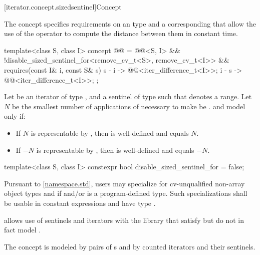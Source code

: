 [iterator.concept.sizedsentinel]{Concept }

\pnum
The  concept specifies
requirements on an  type  and
a corresponding 
that allow the use of the \tcode{-} operator to compute the distance
between them in constant time.

\begin{itemdecl}
template<class S, class I>
  concept @@ =
    @@<S, I> &&
    !disable_sized_sentinel_for<remove_cv_t<S>, remove_cv_t<I>> &&
    requires(const I& i, const S& s) {
      { s - i } -> @@<iter_difference_t<I>>;
      { i - s } -> @@<iter_difference_t<I>>;
    };
\end{itemdecl}

\begin{itemdescr}
\pnum
Let  be an iterator of type , and 
a sentinel of type  such that  denotes a range.
Let $N$ be the smallest number of applications of 
necessary to make  be .
 and  model  only if:
\begin{itemize}
\item If $N$ is representable by ,
      then  is well-defined and equals $N$.

\item If $-N$ is representable by ,
      then  is well-defined and equals $-N$.
\end{itemize}
\end{itemdescr}

%
\begin{itemdecl}
template<class S, class I>
  constexpr bool disable_sized_sentinel_for = false;
\end{itemdecl}

\begin{itemdescr}
\pnum
\remarks
Pursuant to \ref{namespace.std},
users may specialize 
for cv-unqualified non-array object types  and 
if  and/or  is a program-defined type.
Such specializations shall
be usable in constant expressions and
have type .

\pnum
\begin{note}
 allows use of sentinels and iterators with
the library that satisfy but do not in fact model .
\end{note}

\pnum
\begin{example}
The  concept is modeled by pairs of
s and by
counted iterators and their sentinels.
\end{example}
\end{itemdescr}


